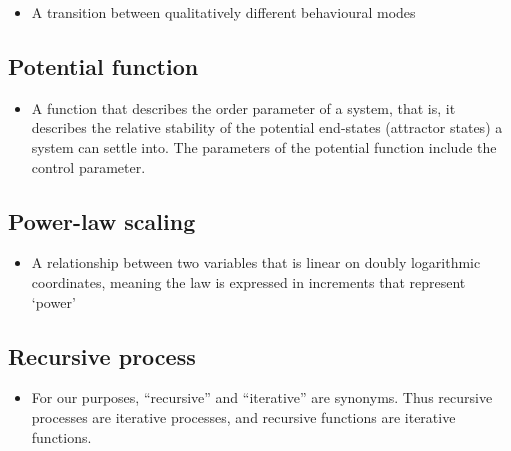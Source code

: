 \documentclass[12pt,]{book}
\providecommand{\tightlist}{%
  \setlength{\itemsep}{0pt}\setlength{\parskip}{0pt}}
\begin{document}
\begin{itemize}
\tightlist
\item
  A transition between qualitatively different behavioural modes
\end{itemize}

\hypertarget{Pote57}{%
\subsection*{\texorpdfstring{\textbf{Potential function}}{Potential function}}\label{Pote57}}

\begin{itemize}
\tightlist
\item
  A function that describes the order parameter of a system, that is, it describes the relative stability of the potential end-states (attractor states) a system can settle into. The parameters of the potential function include the control parameter.
\end{itemize}

\hypertarget{Powe58}{%
\subsection*{\texorpdfstring{\textbf{Power-law scaling}}{Power-law scaling}}\label{Powe58}}

\begin{itemize}
\tightlist
\item
  A relationship between two variables that is linear on doubly logarithmic coordinates, meaning the law is expressed in increments that represent `power'
\end{itemize}

\hypertarget{Recu59}{%
\subsection*{\texorpdfstring{\textbf{Recursive process}}{Recursive process}}\label{Recu59}}

\begin{itemize}
\tightlist
\item
  For our purposes, ``recursive'' and ``iterative'' are synonyms. Thus recursive processes are iterative processes, and recursive functions are iterative functions.
\end{itemize}
\end{document}
